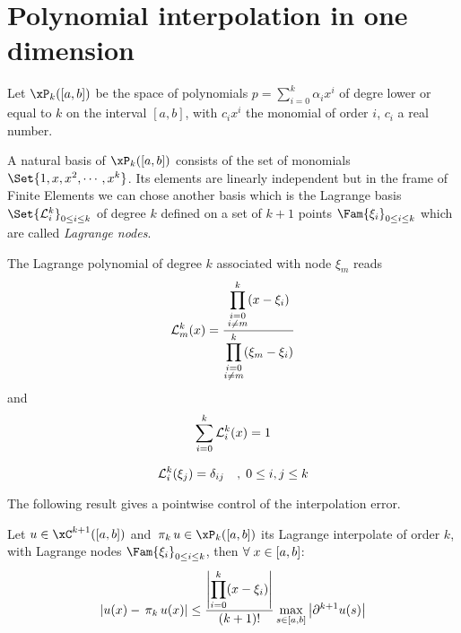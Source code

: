 \section{Polynomial interpolation in one dimension}

Let $\xP_k([a,b])$ be the space of polynomials $p = \sum_{i=0}^k \alpha_i x^i$ of degre lower or equal to $k$ on the interval $[a,b]$, with $c_i x^i$ the monomial of order $i$, $c_i$ a real number.

\medskip
A natural basis of $\xP_k([a,b])$ consists of the set of monomials $\Set{1,x,x^2,\cdots,x^k}$.
Its elements are linearly independent but in the frame of Finite Elements we can chose another basis which is the Lagrange basis $\Set{\Lgr{k}{i}}_{0 \leq i \leq k}$ of degree $k$ defined on a set of $k+1$ points $\Fam{\xi_i}_{0 \leq i \leq k}$ which are called \textit{Lagrange nodes}.

\begin{dfntn}
\label{def:lagrange_poly}
The Lagrange polynomial of degree $k$ associated with node $\xi_m$ reads
\begin{equation*}
\mathcal L^{k}_{m}(x) = \frac{\displaystyle\prod_{\substack{i=0\\i\not=m}}^k (x - \xi_i)}{\displaystyle\prod_{\substack{i=0\\i\not=m}}^k (\xi_m - \xi_i)}
\end{equation*}
and
\begin{equation*}
\sum_{i=0}^{k}\mathcal L^{k}_{i}(x) = 1
\end{equation*}
\end{dfntn}

\begin{prpstn}
\begin{equation*}
\mathcal L^{k}_{i}(\xi_j) = \delta_{ij}\quad,\;0 \leq i,j \leq k
\end{equation*}
\end{prpstn}


\bigskip
The following result gives a pointwise control of the interpolation error.
\begin{thrm}
\label{th:polyinterpol}
Let $u\in\xC^{k+1}([a,b])$ and $\Projh{k} u \in \xP_k([a,b])$ its Lagrange interpolate of order $k$, with Lagrange nodes $\Fam{\xi_i}_{0\leq i \leq k}$, then ${\forall\;} x \in [a,b]$:
\begin{equation*}
\left\lvert u(x) - \,\mathrm{\pi}_{k}\, u(x) \right\rvert \leq \frac{\left\lvert \displaystyle\prod_{i=0}^k (x - \xi_i) \right\rvert}{(k+1)!}\max_{s\in[a,b]}\left\lvert \partial^{k+1} u(s) \right\rvert
\end{equation*}
\end{thrm}

